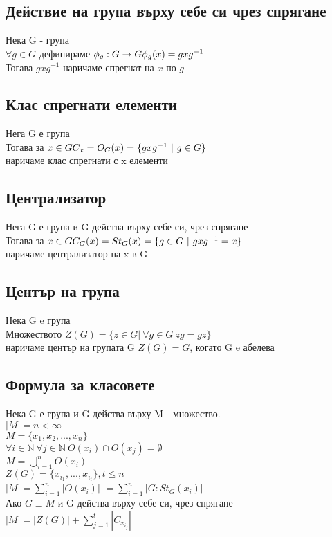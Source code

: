 \documentclass[12pt]{article}
\begin{document}
\subsection{Действие на група върху себе си чрез спрягане}
Нека G - група \\
$\forall g \in G$ дефинираме $\phi_g : G \rightarrow G   \\
 \phi_g(x) = gxg^{-1}$ \\
Тогава $gxg^{-1}$ наричаме спрегнат на $x$ по $g$

\subsection{Клас спрегнати елементи}
Нега G е група \\
Тогава за $x \in G \\
C_x = O_G(x) = \{gxg^{-1} \ | \ g \in G \}$\\
наричаме клас спрегнати с x елементи

\subsection{Централизатор}
Нега G е група и G действа върху себе си, чрез спрягане \\
Тогава за $x \in G \\
C_G(x) = St_G(x) = \{g \in G \ | \ gxg^{-1}=x \}$\\
наричаме централизатор на x в G

\subsection{Център на група}
Нека G e група \\
Множеството $Z(G) = \{z \in G | \ \forall g \in G \ zg = gz \}$\\
наричаме център на групата G
$Z(G) = G$, когато G e абелева

\subsection{Формула за класовете}
Нека G е група и G действа върху M - множество. \\
$|M| = n < \infty$ \\
$M = \{x_1, x_2, ..., x_n\}$ \\
$ \forall i \in \mathbb{N} \ \forall j \in \mathbb{N} \ O(x_i) \cap O(x_j) =\emptyset $ \\
$ M = \bigcup\limits_{i=1}^{n}O(x_i) $ \\
$Z(G) = \{x_{i_1},...,x_{i_t}\}, t \leq n$ \\
$|M| = \sum\limits_{i=1}^{n}|O(x_i)|$ 
$= \sum\limits_{i=1}^{n}|G : St_G(x_i)|$ \\
Ако $G \equiv M$ и G действа върху себе си, чрез спрягане\\
$|M| = |Z(G)| + \sum\limits_{j=1}^{t}|C_{x_{i_j}}|$
\end{document}
